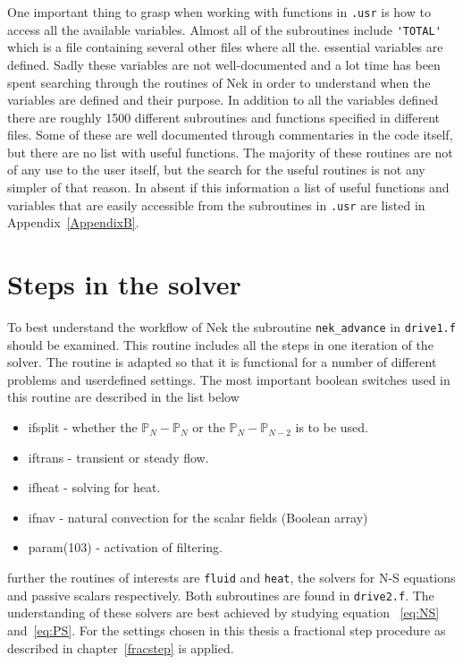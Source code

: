 One important thing to grasp when working with functions in \verb|.usr| is how to access all the 
available variables. 
Almost all of the subroutines include \verb|'TOTAL'| which is a file containing several other files where all the.
essential variables are defined. Sadly these variables are not well-documented and a lot time has been spent 
searching through the routines of Nek in order to understand when the variables are defined and their purpose. 
In addition to all the variables defined there are roughly 1500 different subroutines and functions specified in 
different files. Some of these are well documented through commentaries in the code itself, but there are no 
list with useful functions. The majority of these routines are not of any use to the user itself, but the search for the useful 
routines is not any simpler of that reason. In absent if this information a list of useful functions and variables that are easily 
accessible from the subroutines in \verb|.usr| are listed in Appendix~\ref{AppendixB}.
\section{Steps in the solver}
To best understand the workflow of Nek the subroutine \verb|nek_advance| in \verb|drive1.f| should be examined.
This routine includes all the steps in one iteration of the solver. The routine is adapted so that it is functional
for a number of different problems and userdefined settings. The most important boolean switches used in this routine are 
described in the list below 
%
\begin{itemize}
    \item ifsplit - whether the $\mathbb{P}_N-\mathbb{P}_N$ or the $\mathbb{P}_N-\mathbb{P}_{N-2}$ is to be used.
    \item iftrans - transient or steady flow.
    \item ifheat - solving for heat.
    \item ifnav - natural convection for the scalar fields (Boolean array)
    \item param(103) - activation of filtering.
\end{itemize}
%
further the routines of interests are \verb|fluid| and \verb|heat|, the solvers for N-S equations and passive scalars respectively.
Both subroutines are found in \verb|drive2.f|. The understanding of these solvers are best achieved by studying equation ~\ref{eq:NS} 
and~\ref{eq:PS}. For the settings chosen in this thesis a fractional step procedure as described in 
chapter~\ref{fracstep} is applied.

